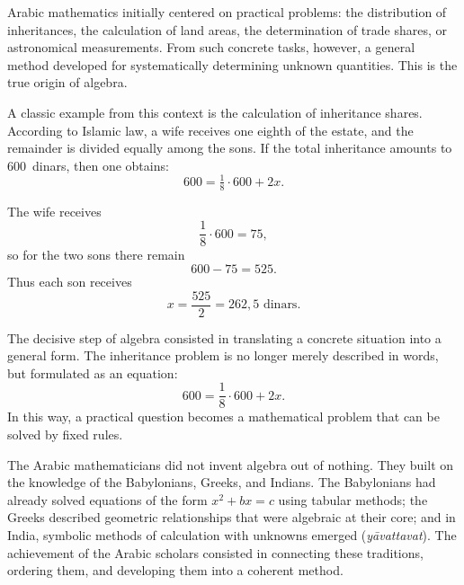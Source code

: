 \begin{HistoryBox}
	\label{box:practice}
	Arabic mathematics initially centered on practical problems:
	the distribution of inheritances, the calculation of land areas,
	the determination of trade shares, or astronomical measurements.
	From such concrete tasks, however, a general method developed
	for systematically determining unknown quantities.
	This is the true origin of algebra.
\end{HistoryBox}

A classic example from this context is the calculation of inheritance shares.
According to Islamic law, a wife receives one eighth of the estate,
and the remainder is divided equally among the sons.
If the total inheritance amounts to 600~dinars, then one obtains:
\[
600 = \tfrac{1}{8}\cdot 600 + 2x.
\]

The wife receives
\[
\frac{1}{8}\cdot 600 = 75,
\]
so for the two sons there remain
\[
600 - 75 = 525.
\]
Thus each son receives
\[
x = \frac{525}{2} = 262{,}5 \text{ dinars}.
\]

\begin{HistoryBox}
	\label{box:abstractequation}
	The decisive step of algebra consisted in translating
	a concrete situation into a general form.
	The inheritance problem is no longer merely described in words,
	but formulated as an equation:
	\[
	600 = \frac{1}{8}\cdot 600 + 2x.
	\]
	In this way, a practical question becomes a mathematical problem
	that can be solved by fixed rules.
\end{HistoryBox}

\begin{NoteBox}
	\label{box:heritage}
	The Arabic mathematicians did not invent algebra out of nothing.
	They built on the knowledge of the Babylonians, Greeks, and Indians.
	The Babylonians had already solved equations of the form \(x^2 + bx = c\)
	using tabular methods; the Greeks described geometric relationships
	that were algebraic at their core;
	and in India, symbolic methods of calculation with unknowns emerged
	(\emph{yāvattavat}).
	The achievement of the Arabic scholars consisted in connecting these traditions,
	ordering them, and developing them into a coherent method.
\end{NoteBox}


